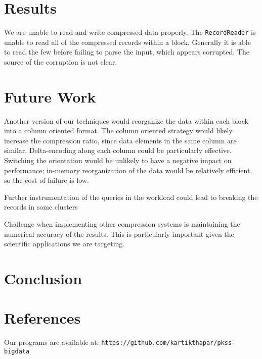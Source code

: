 \documentclass[paper=letter, fontsize=11pt]{scrartcl}
\numberwithin{equation}{section}		%
\numberwithin{figure}{section}			%
\numberwithin{table}{section}				%
\begin{document}
\section{Results}

We are unable to read and write compressed data properly.
The \texttt{RecordReader} is unable to read all of the compressed records within a block.
Generally it is able to read the few before failing to parse the input, which appears corrupted.
The source of the corruption is not clear.

\section{Future Work}
Another version of our techniques would reorganize the data within each block into a column oriented format.  The column oriented strategy would likely increase the compression ratio, since data elements in the same column are similar.  Delta-encoding along each column could be particularly effective.  Switching the orientation would be unlikely to have a negative impact on performance; in-memory reorganization of the data would be relatively efficient, so the cost of failure is low.

Further instrumentation of the queries in the workload could lead to breaking the records in some clusters 

Challenge when implementing other compression systems is maintaining the numerical accuracy of the results.  This is particularly important given the scientific applications we are targeting.

\section{Conclusion}


\section{References}

Our programs are available at:
\texttt{https://github.com/kartikthapar/pkss-bigdata}

\end{document}

